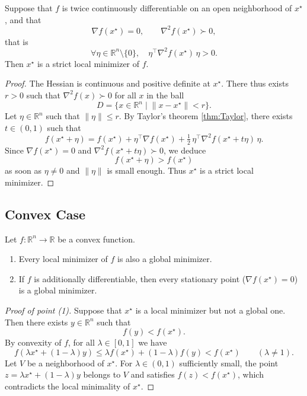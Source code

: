 \begin{theoreme}
\label{thm:second-order-sufficient}
Suppose that $f$ is twice continuously differentiable on an open neighborhood of $x^\star$,
and that
\[
    \nabla f(x^\star) = 0,\qquad
    \nabla^2 f(x^\star) \succ 0,
\]
that is
\[
    \forall \eta \in \mathbb{R}^n\setminus\{0\},\quad
    \eta^\top \nabla^2 f(x^\star)\,\eta > 0.
\]
Then $x^\star$ is a strict local minimizer of $f$.
\end{theoreme}

\begin{proof}
The Hessian is continuous and positive definite at $x^\star$. There thus exists $r>0$ such that
$\nabla^2 f(x) \succ 0$ for all $x$ in the ball
\[
    D = \{ x \in \mathbb{R}^n \;|\; \|x - x^\star\| < r \}.
\]
Let $\eta \in \mathbb{R}^n$ such that $\|\eta\| \le r$.
By Taylor's theorem \ref{thm:Taylor}, there exists $t \in (0,1)$ such that
\[
    f(x^\star + \eta)
    = f(x^\star)
      + \eta^\top \nabla f(x^\star)
      + \tfrac{1}{2}\,\eta^\top \nabla^2 f(x^\star + t\eta)\,\eta.
\]
Since $\nabla f(x^\star) = 0$ and $\nabla^2 f(x^\star + t\eta) \succ 0$, we deduce
\[
    f(x^\star + \eta) > f(x^\star)
\]
as soon as $\eta \neq 0$ and $\|\eta\|$ is small enough. Thus $x^\star$ is a
strict local minimizer.
\end{proof}

\subsection{Convex Case}
\label{subsec:2.2.5}

\begin{theoreme}
\label{thm:convex-case}
Let $f : \mathbb{R}^n \to \mathbb{R}$ be a convex function.
\begin{enumerate}
    \item Every local minimizer of $f$ is also a global minimizer.
    \item If $f$ is additionally differentiable, then every stationary point
    ($\nabla f(x^\star) = 0$) is a global minimizer.
\end{enumerate}
\end{theoreme}

\begin{proof}[Proof of point (1)]
Suppose that $x^\star$ is a local minimizer but not a global one. Then there exists
$y \in \mathbb{R}^n$ such that
\[
    f(y) < f(x^\star).
\]
By convexity of $f$, for all $\lambda \in [0,1]$ we have
\[
    f(\lambda x^\star + (1-\lambda)y)
    \le \lambda f(x^\star) + (1-\lambda) f(y) < f(x^\star) \qquad (\lambda \neq 1).
\]
Let $V$ be a neighborhood of $x^\star$. For $\lambda \in (0,1)$ sufficiently small,
the point $z = \lambda x^\star + (1-\lambda)y$ belongs to $V$ and satisfies
$f(z) < f(x^\star)$, which contradicts the local minimality of $x^\star$.
\end{proof}

